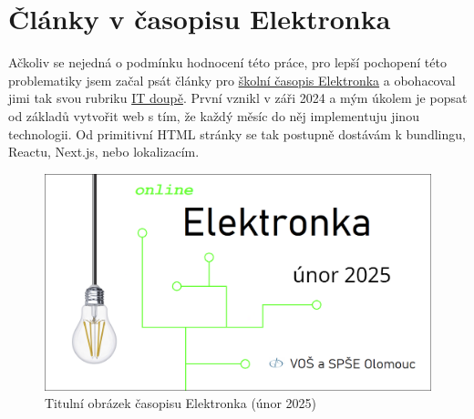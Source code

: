 \chapter{Články v časopisu Elektronka}
Ačkoliv se nejedná o podmínku hodnocení této práce, pro lepší pochopení této problematiky jsem začal psát články pro \href{https://www.spseol.cz/prace-zaku-a-studentu/casopis-elektronka}{školní časopis Elektronka}\cite{Elektronka} a obohacoval jimi tak svou rubriku \href{https://github.com/dlabaja/IT_doupe}{IT doupě}\cite{ITDoupe}. První vznikl v záři 2024 a mým úkolem je popsat od základů vytvořit web s tím, že každý měsíc do něj implementuju jinou technologii. Od primitivní HTML stránky se tak postupně dostávám k bundlingu, Reactu, Next.js, nebo lokalizacím.

\begin{figure}[!h]
    \centering
    \includegraphics[width=1\linewidth]{obrazky/elektronka.png}
    \caption{Titulní obrázek časopisu Elektronka (únor 2025)\cite{Elektronka}}
    \label{fig:elektronka}
\end{figure}

